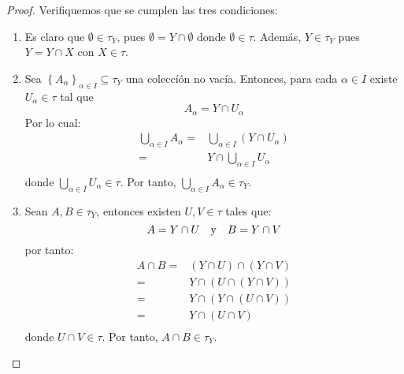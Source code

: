 \documentclass[12pt]{report}
\theoremstyle{largebreak}
\begin{document}
    \begin{proof}
        Verifiquemos que se cumplen las tres condiciones:
        \begin{enumerate}
            \item Es claro que $\emptyset\in\tau_Y$, pues $\emptyset=Y\cap\emptyset$ donde $\emptyset\in\tau$. Además, $Y\in\tau_Y$ pues $Y=Y\cap X$ con $X\in\tau$.
            \item Sea $\left\{A_\alpha \right\}_{\alpha\in I}\subseteq\tau_Y$ una coleccíón no vacía. Entonces, para cada $\alpha\in I$ existe $U_\alpha\in\tau$ tal que
            \begin{equation*}
                A_\alpha=Y\cap U_\alpha
            \end{equation*}
            Por lo cual:
            \begin{equation*}
                \begin{split}
                    \bigcup_{\alpha\in I }A_\alpha=&\bigcup_{\alpha\in I }\left(Y\cap U_\alpha \right) \\
                    =&Y\cap \bigcup_{\alpha\in I } U_\alpha\\
                \end{split}
            \end{equation*}
            donde $\bigcup_{\alpha\in I } U_\alpha\in\tau$. Por tanto, $\bigcup_{\alpha\in I }A_\alpha\in\tau_Y$.
            \item Sean $A,B\in\tau_Y$, entonces existen $U,V\in\tau$ tales que:
            \begin{equation*}
                A=Y\cap U\quad\textup{y}\quad B=Y\cap V
            \end{equation*}
            por tanto:
            \begin{equation*}
                \begin{split}
                    A\cap B=&(Y\cap U)\cap (Y\cap V)\\
                    =&Y\cap (U\cap (Y\cap V))\\
                    =&Y\cap (Y\cap (U\cap V))\\
                    =&Y\cap (U\cap V)\\
                \end{split}
            \end{equation*}
            donde $U\cap V\in\tau$. Por tanto, $A\cap B\in\tau_Y$.
        \end{enumerate}
    \end{proof}
    
\end{document}
